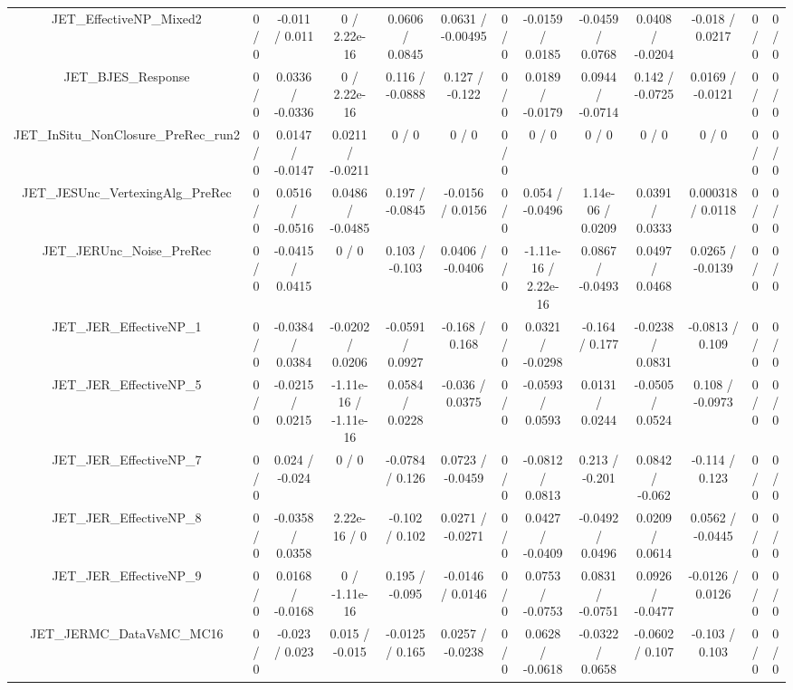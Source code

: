 \documentclass[10pt]{article}
\begin{document}
\begin{table}[htbp]
\begin{center}
\begin{tabular}{|c|c|c|c|c|c|c|c|c|c|c|c|c|}
  JET_EffectiveNP_Mixed2 & 0 / 0 & -0.011 / 0.011 & 0 / 2.22e-16 & 0.0606 / 0.0845 & 0.0631 / -0.00495 & 0 / 0 & -0.0159 / 0.0185 & -0.0459 / 0.0768 & 0.0408 / -0.0204 & -0.018 / 0.0217 & 0 / 0 & 0 / 0 \\ 
  JET_BJES_Response & 0 / 0 & 0.0336 / -0.0336 & 0 / 2.22e-16 & 0.116 / -0.0888 & 0.127 / -0.122 & 0 / 0 & 0.0189 / -0.0179 & 0.0944 / -0.0714 & 0.142 / -0.0725 & 0.0169 / -0.0121 & 0 / 0 & 0 / 0 \\ 
  JET_InSitu_NonClosure_PreRec_run2 & 0 / 0 & 0.0147 / -0.0147 & 0.0211 / -0.0211 & 0 / 0 & 0 / 0 & 0 / 0 & 0 / 0 & 0 / 0 & 0 / 0 & 0 / 0 & 0 / 0 & 0 / 0 \\ 
  JET_JESUnc_VertexingAlg_PreRec & 0 / 0 & 0.0516 / -0.0516 & 0.0486 / -0.0485 & 0.197 / -0.0845 & -0.0156 / 0.0156 & 0 / 0 & 0.054 / -0.0496 & 1.14e-06 / 0.0209 & 0.0391 / 0.0333 & 0.000318 / 0.0118 & 0 / 0 & 0 / 0 \\ 
  JET_JERUnc_Noise_PreRec & 0 / 0 & -0.0415 / 0.0415 & 0 / 0 & 0.103 / -0.103 & 0.0406 / -0.0406 & 0 / 0 & -1.11e-16 / 2.22e-16 & 0.0867 / -0.0493 & 0.0497 / 0.0468 & 0.0265 / -0.0139 & 0 / 0 & 0 / 0 \\ 
  JET_JER_EffectiveNP_1 & 0 / 0 & -0.0384 / 0.0384 & -0.0202 / 0.0206 & -0.0591 / 0.0927 & -0.168 / 0.168 & 0 / 0 & 0.0321 / -0.0298 & -0.164 / 0.177 & -0.0238 / 0.0831 & -0.0813 / 0.109 & 0 / 0 & 0 / 0 \\ 
  JET_JER_EffectiveNP_5 & 0 / 0 & -0.0215 / 0.0215 & -1.11e-16 / -1.11e-16 & 0.0584 / 0.0228 & -0.036 / 0.0375 & 0 / 0 & -0.0593 / 0.0593 & 0.0131 / 0.0244 & -0.0505 / 0.0524 & 0.108 / -0.0973 & 0 / 0 & 0 / 0 \\ 
  JET_JER_EffectiveNP_7 & 0 / 0 & 0.024 / -0.024 & 0 / 0 & -0.0784 / 0.126 & 0.0723 / -0.0459 & 0 / 0 & -0.0812 / 0.0813 & 0.213 / -0.201 & 0.0842 / -0.062 & -0.114 / 0.123 & 0 / 0 & 0 / 0 \\ 
  JET_JER_EffectiveNP_8 & 0 / 0 & -0.0358 / 0.0358 & 2.22e-16 / 0 & -0.102 / 0.102 & 0.0271 / -0.0271 & 0 / 0 & 0.0427 / -0.0409 & -0.0492 / 0.0496 & 0.0209 / 0.0614 & 0.0562 / -0.0445 & 0 / 0 & 0 / 0 \\ 
  JET_JER_EffectiveNP_9 & 0 / 0 & 0.0168 / -0.0168 & 0 / -1.11e-16 & 0.195 / -0.095 & -0.0146 / 0.0146 & 0 / 0 & 0.0753 / -0.0753 & 0.0831 / -0.0751 & 0.0926 / -0.0477 & -0.0126 / 0.0126 & 0 / 0 & 0 / 0 \\ 
  JET_JERMC_DataVsMC_MC16 & 0 / 0 & -0.023 / 0.023 & 0.015 / -0.015 & -0.0125 / 0.165 & 0.0257 / -0.0238 & 0 / 0 & 0.0628 / -0.0618 & -0.0322 / 0.0658 & -0.0602 / 0.107 & -0.103 / 0.103 & 0 / 0 & 0 / 0 \\ 

\end{tabular}
\end{center}
\end{table}
\end{document}
